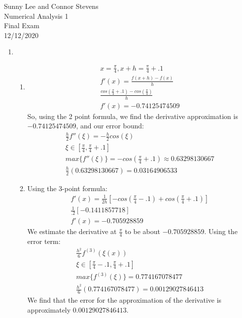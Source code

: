 \documentclass[12pt,letterpaper]{article}
\begin{document}
Sunny Lee and Connor Stevens\\
Numerical Analysis 1\\
Final Exam\\
12/12/2020\\
\begin{enumerate}
    \item 
    \begin{enumerate}
        \item 
        \begin{gather}
            x = \frac{\pi}{4}, x+h = \frac{\pi}{4} + .1\\
            f'(x) = \frac{f(x+h) - f(x)}{h}\\
            \frac{cos(\frac{\pi}{4} + .1) - cos(\frac{\pi}{4})}{h}\\
            f'(x) = -0.74125474509
        \end{gather}
        So, using the 2 point formula, we find the derivative approximation is $-0.74125474509$,
        and our error bound: 
        \begin{gather}
            \frac{h}{2}f''(\xi) = -\frac{h}{2}cos(\xi)\\
            \xi \in [\frac{\pi}{4}, \frac{\pi}{4}+.1]\\
            max\{f''(\xi)\} = -cos(\frac{\pi}{4}+.1) \approx 0.63298130667\\
            \frac{h}{2}(0.63298130667) = 0.03164906533
        \end{gather}
        
        \item 
        Using the 3-point formula: 
        \begin{gather}
            f'(x) = \frac{1}{2h}[-cos(\frac{\pi}{4} - .1) + cos(\frac{\pi}{4} + .1)]\\
            \frac{1}{.2}[-0.1411857718]\\
            f'(x) = -0.705928859
        \end{gather}
        We estimate the derivative at $\frac{\pi}{4}$ to be about $-0.705928859$. 
        Using the error term: 
        \begin{gather}
            \frac{h^2}{6}f^{(3)}(\xi(x))\\
            \xi \in [\frac{\pi}{4} - .1, \frac{\pi}{4} + .1]\\
            max\{f^{(3)}(\xi)\} = 0.774167078477\\
            \frac{h^2}{6}(0.774167078477) = 0.00129027846413
        \end{gather} 
        We find that the error for the approximation of the derivative is approximately
        $0.00129027846413$.


\end{enumerate}
\end{enumerate}
\end{document}
